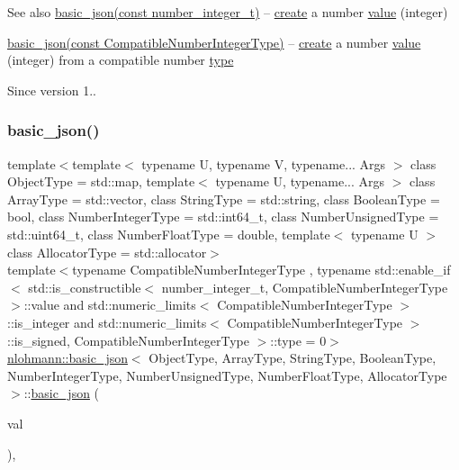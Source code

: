 \begin{DoxySeeAlso}{See also}
\hyperlink{classnlohmann_1_1basic__json_a0d838bc7ffca6017f51167e0a8ffd9b6}{basic\+\_\+json(const number\+\_\+integer\+\_\+t)} -- \hyperlink{classnlohmann_1_1basic__json_afdb7a485369fbfd8c4c7c134ebb1feb5}{create} a number \hyperlink{classnlohmann_1_1basic__json_a407e73a037e6e3067ef7aa2c25a79f39}{value} (integer) 

\hyperlink{classnlohmann_1_1basic__json_ad2eddc2c13ab084f067eaba65d381ad2}{basic\+\_\+json(const Compatible\+Number\+Integer\+Type)} -- \hyperlink{classnlohmann_1_1basic__json_afdb7a485369fbfd8c4c7c134ebb1feb5}{create} a number \hyperlink{classnlohmann_1_1basic__json_a407e73a037e6e3067ef7aa2c25a79f39}{value} (integer) from a compatible number \hyperlink{classnlohmann_1_1basic__json_a5d466b240d0ba9f648d7fd4ff42359f5}{type}
\end{DoxySeeAlso}
\begin{DoxySince}{Since}
version 1.. 
\end{DoxySince}
\hypertarget{classnlohmann_1_1basic__json_ad2eddc2c13ab084f067eaba65d381ad2}{}\label{classnlohmann_1_1basic__json_ad2eddc2c13ab084f067eaba65d381ad2} 
\subsubsection{\texorpdfstring{basic\+\_\+json()}{basic\_json()}\hspace{0.1cm}{\footnotesize\ttfamily [13/23]}}
{\footnotesize\ttfamily template$<$template$<$ typename U, typename V, typename... Args $>$ class Object\+Type = std\+::map, template$<$ typename U, typename... Args $>$ class Array\+Type = std\+::vector, class String\+Type  = std\+::string, class Boolean\+Type  = bool, class Number\+Integer\+Type  = std\+::int64\+\_\+t, class Number\+Unsigned\+Type  = std\+::uint64\+\_\+t, class Number\+Float\+Type  = double, template$<$ typename U $>$ class Allocator\+Type = std\+::allocator$>$ \\
template$<$typename Compatible\+Number\+Integer\+Type , typename std\+::enable\+\_\+if$<$ std\+::is\+\_\+constructible$<$ number\+\_\+integer\+\_\+t, Compatible\+Number\+Integer\+Type $>$\+::value and std\+::numeric\+\_\+limits$<$ Compatible\+Number\+Integer\+Type $>$\+::is\+\_\+integer and std\+::numeric\+\_\+limits$<$ Compatible\+Number\+Integer\+Type $>$\+::is\+\_\+signed, Compatible\+Number\+Integer\+Type $>$\+::type  = 0$>$ \\
\hyperlink{classnlohmann_1_1basic__json}{nlohmann\+::basic\+\_\+json}$<$ Object\+Type, Array\+Type, String\+Type, Boolean\+Type, Number\+Integer\+Type, Number\+Unsigned\+Type, Number\+Float\+Type, Allocator\+Type $>$\+::\hyperlink{classnlohmann_1_1basic__json}{basic\+\_\+json} (\begin{DoxyParamCaption}\item[{const Compatible\+Number\+Integer\+Type}]{val }\end{DoxyParamCaption})\hspace{0.3cm}{\ttfamily [inline]}, {\ttfamily [noexcept]}}



